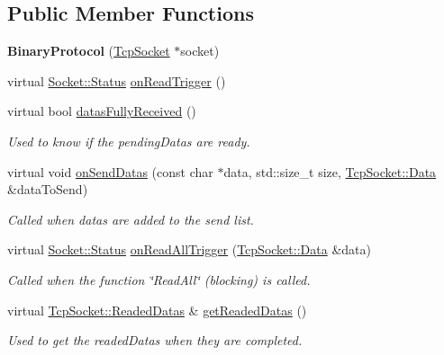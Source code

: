\subsection*{Public Member Functions}
\begin{DoxyCompactItemize}
\item 
\hypertarget{classmognetwork_1_1protocol_1_1_binary_protocol_a2338021e2845389a21e15cd8d7075dc8}{{\bfseries Binary\-Protocol} (\hyperlink{classmognetwork_1_1_tcp_socket}{Tcp\-Socket} $\ast$socket)}\label{classmognetwork_1_1protocol_1_1_binary_protocol_a2338021e2845389a21e15cd8d7075dc8}

\item 
virtual \hyperlink{classmognetwork_1_1_socket_aa187a8394ac0d6203af0ec7f021ca15f}{Socket\-::\-Status} \hyperlink{classmognetwork_1_1protocol_1_1_binary_protocol_af397288f27924ce552f23f35defb8770}{on\-Read\-Trigger} ()
\item 
virtual bool \hyperlink{classmognetwork_1_1protocol_1_1_binary_protocol_ab945fba1fc99c61de881af2f8e082f9b}{datas\-Fully\-Received} ()
\begin{DoxyCompactList}\small\item\em Used to know if the pending\-Datas are ready. \end{DoxyCompactList}\item 
virtual void \hyperlink{classmognetwork_1_1protocol_1_1_binary_protocol_a7a3c0fbaa42855d9a79fd943bea94960}{on\-Send\-Datas} (const char $\ast$data, std\-::size\-\_\-t size, \hyperlink{classmognetwork_1_1_tcp_socket_aa80d910649a16cedb6c98297e5893ed1}{Tcp\-Socket\-::\-Data} \&data\-To\-Send)
\begin{DoxyCompactList}\small\item\em Called when datas are added to the send list. \end{DoxyCompactList}\item 
virtual \hyperlink{classmognetwork_1_1_socket_aa187a8394ac0d6203af0ec7f021ca15f}{Socket\-::\-Status} \hyperlink{classmognetwork_1_1protocol_1_1_binary_protocol_a15af1a59b3f53351d562414fc3905575}{on\-Read\-All\-Trigger} (\hyperlink{classmognetwork_1_1_tcp_socket_aa80d910649a16cedb6c98297e5893ed1}{Tcp\-Socket\-::\-Data} \&data)
\begin{DoxyCompactList}\small\item\em Called when the function \char`\"{}\-Read\-All\char`\"{} (blocking) is called. \end{DoxyCompactList}\item 
virtual \hyperlink{structmognetwork_1_1_tcp_socket_1_1_readed_datas}{Tcp\-Socket\-::\-Readed\-Datas} \& \hyperlink{classmognetwork_1_1protocol_1_1_binary_protocol_a1033401c77e30598f5a90624156c73e9}{get\-Readed\-Datas} ()
\begin{DoxyCompactList}\small\item\em Used to get the readed\-Datas when they are completed. \end{DoxyCompactList}\end{DoxyCompactItemize}
